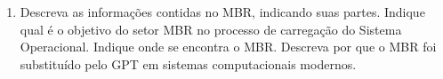 \begin{enumerate}
    \item
    Descreva as informações contidas no MBR, indicando suas partes.
    Indique qual é o objetivo do setor MBR no processo de carregação do Sistema Operacional.
    Indique onde se encontra o MBR.
    Descreva por que o MBR foi substituído pelo GPT 
    em sistemas computacionais modernos.
\end{enumerate}
